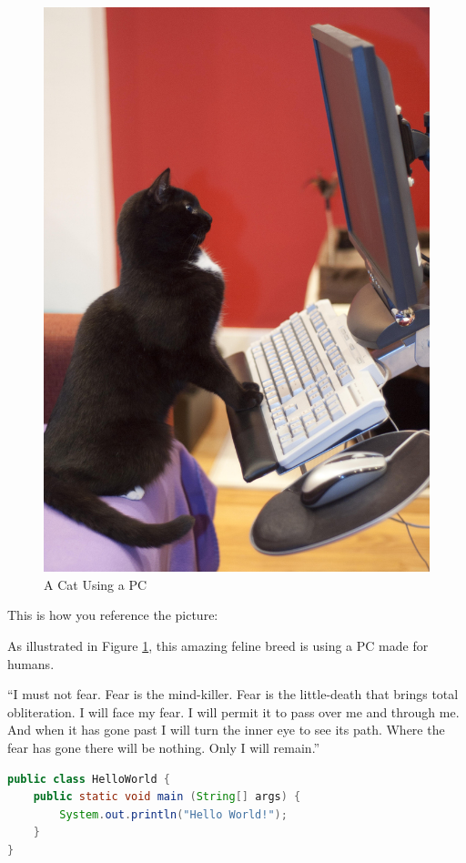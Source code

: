 \documentclass[12pt,12pt,a4paper,oneside,bibliography=totoc]{scrbook}
\begin{document}
\begin{figure}[htbp]
\centering
\includegraphics{images/cat.jpg}
\caption{A Cat Using a PC \label{fig:cat_pc}}
\end{figure}

This is how you reference the picture:

As illustrated in Figure \ref{fig:cat_pc}, this amazing feline breed is
using a PC made for humans.

``I must not fear. Fear is the mind-killer. Fear is the little-death
that brings total obliteration. I will face my fear. I will permit it to
pass over me and through me. And when it has gone past I will turn the
inner eye to see its path. Where the fear has gone there will be
nothing. Only I will remain.'' \autocite{dune1990}

\begin{lstlisting}[language=Java, caption=A great example of the famous HelloWorld, frame=single, label=lst:codeSnippet]
public class HelloWorld {
    public static void main (String[] args) {
        System.out.println("Hello World!");
    }
}
\end{lstlisting}
\end{document}
